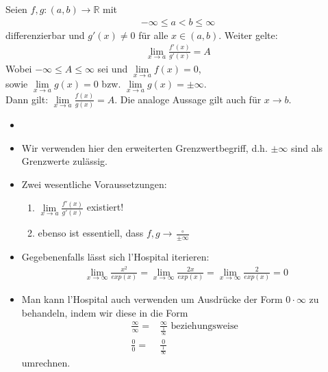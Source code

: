 \begin{Satz}{\label{regel_von_hospital}
	Seien $f,g: (a,b) \rightarrow \mathbb{R}$ mit
	\begin{align*}
		-\infty \leq a < b \leq \infty
	\end{align*}		
	differenzierbar und $g'(x) \neq 0$ für alle $x \in (a,b)$. Weiter gelte:
	\begin{align*}
		\lim\limits_{x \rightarrow a}{\frac{f'(x)}{g'(x)} } = A
	\end{align*}
	Wobei  $ -\infty \leq A \leq \infty$ sei und 
	$\lim\limits_{x \rightarrow a}{f(x) = 0}$, \\ 
	sowie 
	$\lim\limits_{x \rightarrow a}{g(x) = 0} $
	bzw. $\lim\limits_{x\rightarrow a}{g(x) = \pm \infty}$.\\
	Dann gilt: $\lim\limits_{x \rightarrow a}{\frac{f(x)}{g(x)} = A}$.
	Die analoge Aussage gilt auch für $x \rightarrow b$.
}\end{Satz}

\begin{Bemerkung}{
	\begin{itemize}
		\item[ ]
		\item Wir verwenden hier den erweiterten Grenzwertbegriff, d.h. $\pm \infty$ 
		sind als Grenzwerte zulässig.
		\item Zwei wesentliche Voraussetzungen:
			\begin{enumerate}
				\item $\lim\limits_{x \rightarrow a}
				{\frac{f'(x)}{g'(x)}}$ existiert!
				\item ebenso ist essentiell, dass $f,g \rightarrow 
				\frac{\circ }{\pm \infty}$
			\end{enumerate}
		\item Gegebenenfalls lässt sich l'Hospital iterieren:
		\begin{align*}
			\lim\limits_{x \rightarrow \infty}{\frac{x^2}{exp(x)}} = 
			\lim\limits_{x \rightarrow \infty}{\frac{2x}{exp(x)}} = 
			\lim\limits_{x \rightarrow \infty}{\frac{2}{exp(x)}} = 0
		\end{align*}
		\item Man kann l'Hospital auch verwenden um Ausdrücke der Form 
		$0 \cdot \infty$ zu behandeln, indem wir diese in die Form
		\begin{align*}
		 	\frac{\infty}{\infty} = & \frac{\infty}{\frac{1}{\infty}} \text{ beziehungsweise } \\ 
			\frac{0}{0} = & \frac{0}{\frac{1}{\infty}}
		\end{align*}
		umrechnen.
	\end{itemize}
}\end{Bemerkung}
	

